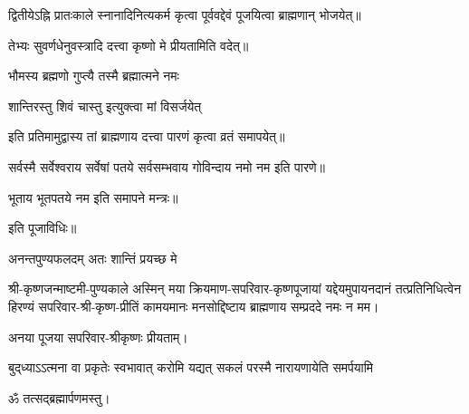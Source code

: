 \begin{center}
द्वितीयेऽह्नि प्रातःकाले स्नानादिनित्यकर्म कृत्वा पूर्ववद्देवं पूजयित्वा ब्राह्मणान् भोजयेत्॥

तेभ्यः सुवर्णधेनुवस्त्रादि दत्त्वा कृष्णो मे प्रीयतामिति वदेत्॥

{भौमस्य ब्रह्मणो गुप्त्यै तस्मै ब्रह्मात्मने नमः}

{शान्तिरस्तु शिवं चास्तु इत्युक्त्वा मां विसर्जयेत्}

इति प्रतिमामुद्वास्य तां ब्राह्मणाय दत्त्वा पारणं कृत्वा व्रतं समापयेत्॥

सर्वस्मै सर्वेश्वराय सर्वेषां पतये सर्वसम्भवाय गोविन्दाय नमो नम इति पारणे॥

भूताय भूतपतये नम इति समापने मन्त्रः॥

इति पूजाविधिः॥

\closesub

{अनन्तपुण्यफलदम् अतः शान्तिं प्रयच्छ मे}

श्री-कृष्णजन्माष्टमी-पुण्यकाले अस्मिन् मया क्रियमाण-सपरिवार-कृष्णपूजायां यद्देयमुपायनदानं तत्प्रतिनिधित्वेन हिरण्यं सपरिवार-श्री-कृष्ण-प्रीतिं कामयमानः मनसोद्दिष्टाय ब्राह्मणाय सम्प्रददे नमः न मम। 

अनया पूजया सपरिवार-श्रीकृष्णः प्रीयताम्। 
 
{बुद्‌ध्याऽऽत्मना वा प्रकृतेः स्वभावात्}
{करोमि यद्यत् सकलं परस्मै}
{नारायणायेति समर्पयामि}

ॐ तत्सद्ब्रह्मार्पणमस्तु।

\closesection

\end{center}





\closesection
